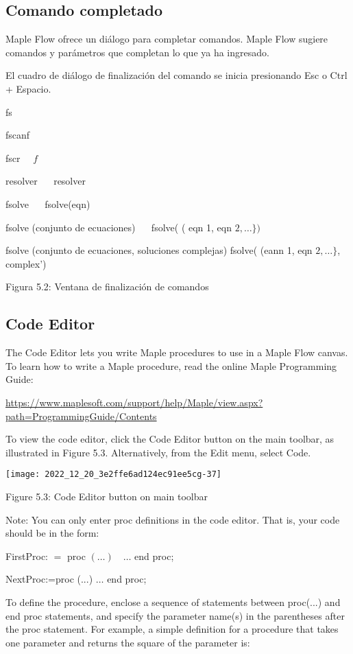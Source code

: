 \subsection{Comando completado}
Maple Flow ofrece un diálogo para completar comandos. Maple Flow sugiere comandos y parámetros que completan lo que ya ha ingresado.

El cuadro de diálogo de finalización del comando se inicia presionando Esc o Ctrl + Espacio.

fs

fscanf

fscr $\quad f$

resolver $\quad$ resolver

fsolve $\quad$ fsolve(eqn)

fsolve (conjunto de ecuaciones) $\quad$ fsolve( ( eqn 1, eqn $2, \ldots\})$

fsolve (conjunto de ecuaciones, soluciones complejas) fsolve( (eann 1, eqn $2, \ldots\}$, complex')

Figura 5.2: Ventana de finalización de comandos

\subsection{Code Editor}
The Code Editor lets you write Maple procedures to use in a Maple Flow canvas. To learn how to write a Maple procedure, read the online Maple Programming Guide:

\href{https://www.maplesoft.com/support/help/Maple/view.aspx?path=ProgrammingGuide/Contents}{https://www.maplesoft.com/support/help/Maple/view.aspx?path=ProgrammingGuide/Contents}

To view the code editor, click the Code Editor button on the main toolbar, as illustrated in Figure 5.3. Alternatively, from the Edit menu, select Code.

\begin{center}
\texttt{[image: 2022\_12\_20\_3e2ffe6ad124ec91ee5cg-37]}
\end{center}

Figure 5.3: Code Editor button on main toolbar

Note: You can only enter proc definitions in the code editor. That is, your code should be in the form:

FirstProc: $=$ proc $(\ldots) \quad \ldots$ end proc;

NextProc:=proc (...) $\ldots$ end proc;

To define the procedure, enclose a sequence of statements between proc(...) and end proc statements, and specify the parameter name(s) in the parentheses after the proc statement. For example, a simple definition for a procedure that takes one parameter and returns the square of the parameter is:

